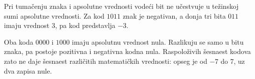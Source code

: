 
Pri tumačenju znaka i apsolutne vrednosti vodeći bit ne učestvuje u težinskoj sumi apsolutne vrednosti. Za kod $1011$ znak je negativan, a donja tri bita $011$ imaju vrednost $3$, pa kod predstavlja $-3$.

Oba koda $0000$ i $1000$ imaju apsolutnu vrednost nula. Razlikuju se samo u bitu znaka, pa postoje pozitivna i negativna kodna nula. Raspoloživih šesnaest kodova zato ne daje šesnaest različitih matematičkih vrednosti: opseg je od $-7$ do $7$, uz dva zapisa nule.
